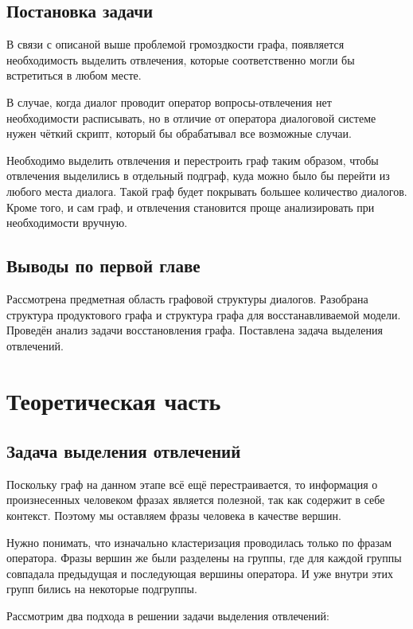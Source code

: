 \documentclass[specification,annotation]{itmo-student-thesis}
\begin{document}
	
	\section{Постановка задачи}
	В связи с описаной выше проблемой громоздкости графа, появляется необходимость выделить отвлечения, которые соответственно могли бы встретиться в любом месте.
	
	В случае, когда диалог проводит оператор вопросы-отвлечения нет необходимости расписывать, но в отличие от оператора диалоговой системе нужен чёткий скрипт, который бы обрабатывал все возможные случаи.
	
	Необходимо выделить отвлечения и перестроить граф таким образом, чтобы отвлечения выделились в отдельный подграф, куда можно было бы перейти из любого места диалога. Такой граф будет покрывать большее количество диалогов. Кроме того, и сам граф, и отвлечения становится проще анализировать при необходимости вручную.
	
	\section{Выводы по первой главе}
	Рассмотрена предметная область графовой структуры диалогов. Разобрана структура продуктового графа и структура графа для восстанавливаемой модели. Проведён анализ задачи восстановления графа. Поставлена задача выделения отвлечений. 
	
	\chapter{Теоретическая часть}
	\section{Задача выделения отвлечений}
	Поскольку граф на данном этапе всё ещё перестраивается, то информация о произнесенных человеком фразах является полезной, так как содержит в себе контекст. Поэтому мы оставляем фразы человека в качестве вершин.
	
	Нужно понимать, что изначально кластеризация проводилась только по фразам оператора. Фразы вершин же были разделены на группы, где для каждой группы совпадала предыдущая и последующая вершины оператора. И уже внутри этих групп бились на некоторые подгруппы.
	
	Рассмотрим два подхода в решении задачи выделения отвлечений:
	
\end{document}

